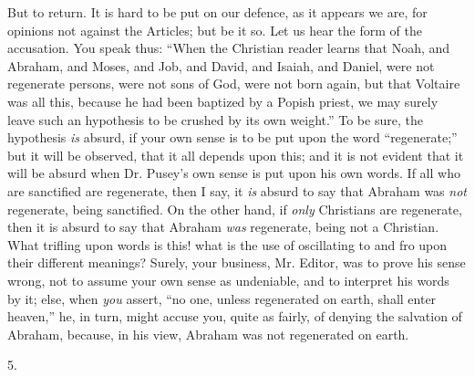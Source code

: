 But to return. It is hard to be put on our
defence, as it appears we are, for opinions not against the Articles;
but be it so. Let us hear the form of the accusation. You speak thus: ``When
the Christian reader learns that Noah, and Abraham, and Moses, and
Job, and David, and Isaiah, and Daniel, were not regenerate persons,
were not sons of God, were not born again, but that Voltaire was all
this, because he had been baptized by a Popish priest, we may surely
leave such an hypothesis to be crushed by its own weight.'' To be sure,
the hypothesis \emph{is} absurd, if your own sense is to be put upon the word
``regenerate;'' but it will be observed, that it all depends upon this;
and it is not evident that it will be absurd when Dr. Pusey's own
sense is put upon his own words. If all who are sanctified are
regenerate, then I say, it \emph{is} absurd to say that Abraham was \emph{not}
regenerate, being sanctified. On the other hand, if \emph{only} Christians
are regenerate, then it is absurd to say that Abraham \emph{was} regenerate,
being not a Christian. What trifling upon words is this! what is the
use of oscillating to and fro upon their different meanings? Surely,
your business, Mr. Editor, was to prove his sense wrong, not to assume
your own sense as undeniable, and to interpret his words by it; else,
when \emph{you} assert, ``no one, unless regenerated on earth, shall enter
heaven,'' he, in turn, might accuse you, quite as fairly, of denying
the salvation of Abraham, because, in his view, Abraham was not
regenerated on earth.

5.

